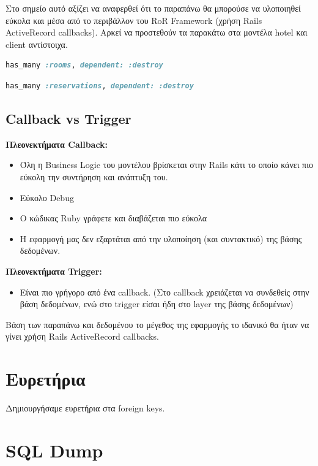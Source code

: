 \documentclass[a4paper,12pt]{article}
\begin{document}
Στο σημείο αυτό αξίζει να αναφερθεί ότι το παραπάνω θα μπορούσε να υλοποιηθεί εύκολα και μέσα από το περιβάλλον του RoR Framework (χρήση Rails ActiveRecord callbacks). Αρκεί να προστεθούν τα παρακάτω στα μοντέλα hotel και client αντίστοιχα.

\begin{lstlisting}[language=Ruby]
has_many :rooms, dependent: :destroy
\end{lstlisting}

\begin{lstlisting}[language=Ruby]
has_many :reservations, dependent: :destroy
\end{lstlisting}

\subsection{Callback vs Trigger}
	\textbf{Πλεονεκτήματα Callback:}
	\begin{itemize}
	  \item Όλη η Business Logic του μοντέλου βρίσκεται στην Rails κάτι το οποίο κάνει πιο εύκολη την συντήρηση και ανάπτυξη του.
	  \item Εύκολο Debug
	  \item Ο κώδικας Ruby γράφετε και διαβάζεται πιο εύκολα
	  \item Η εφαρμογή μας δεν εξαρτάται από την υλοποίηση (και συντακτικό) της βάσης δεδομένων.
	\end{itemize}
	\textbf{Πλεονεκτήματα Trigger:}
	\begin{itemize}
	  \item Είναι πιο γρήγορο από ένα callback. (Στο callback χρειάζεται να συνδεθείς στην βάση δεδομένων, ενώ στο trigger είσαι ήδη στο layer της βάσης δεδομένων)
	\end{itemize}
	Βάση των παραπάνω και δεδομένου το μέγεθος της εφαρμογής το ιδανικό θα ήταν να γίνει χρήση Rails ActiveRecord callbacks.

\section{Ευρετήρια}
Δημιουργήσαμε ευρετήρια στα foreign keys.


\section{SQL Dump}

\end{document}
